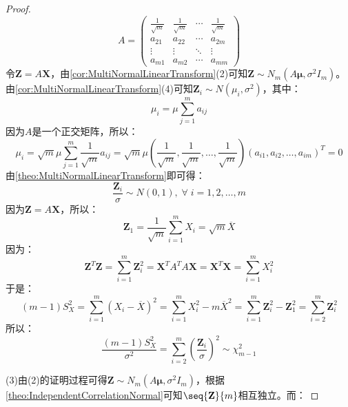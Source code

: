 \begin{proof}
\begin{equation*}
		A=
		\begin{pmatrix}
			\frac{1}{\sqrt{m}} & \frac{1}{\sqrt{m}} & \cdots & \frac{1}{\sqrt{m}} \\
			a_{21} & a_{22} & \cdots & a_{2m} \\
			\vdots & \vdots & \ddots & \vdots \\
			a_{m1} & a_{m2} & \cdots & a_{mm}
		\end{pmatrix}
	\end{equation*}
	令$\mathbf{Z}=A\mathbf{X}$，由\cref{cor:MultiNormalLinearTransform}(2)可知$\mathbf{Z}\sim N_m(A\boldsymbol{\mu},\sigma^2I_m)$。由\cref{cor:MultiNormalLinearTransform}(4)可知$\mathbf{Z}_i\sim N(\mu_i,\sigma^2)$，其中：
	\begin{equation*}
		\mu_i=\mu\sum_{j=1}^{m}a_{ij}
	\end{equation*}
	因为$A$是一个正交矩阵，所以：
	\begin{equation*}
		\mu_i=\sqrt{m}\mu\sum_{j=1}^{m}\frac{1}{\sqrt{m}}a_{ij}=\sqrt{m}\mu\left(\dfrac{1}{\sqrt{m}},\dfrac{1}{\sqrt{m}},\dots,\dfrac{1}{\sqrt{m}}\right)(a_{i1},a_{i2},\dots,a_{im})^T=0
	\end{equation*}
	由\cref{theo:MultiNormalLinearTransform}即可得：
	\begin{equation*}
		\frac{\mathbf{Z}_i}{\sigma}\sim N(0,1),\;\forall\;i=1,2,\dots,m
	\end{equation*}
	因为$\mathbf{Z}=A\mathbf{X}$，所以：
	\begin{equation*}
		\mathbf{Z}_1=\frac{1}{\sqrt{m}}\sum_{i=1}^{m}X_i=\sqrt{m}\overline{X}
	\end{equation*}
	因为：
	\begin{equation*}
		\mathbf{Z}^T\mathbf{Z}=\sum_{i=1}^{m}\mathbf{Z}_i^2=\mathbf{X}^TA^TA\mathbf{X}=\mathbf{X}^T\mathbf{X}=\sum_{i=1}^{m}X_i^2
	\end{equation*}
	于是：
	\begin{equation*}
		(m-1)S_X^2=\sum_{i=1}^{m}(X_i-\overline{X})^2=\sum_{i=1}^{m}X_i^2-m\overline{X}^2=\sum_{i=1}^{m}\mathbf{Z}_i^2-\mathbf{Z}_1^2=\sum_{i=2}^{m}\mathbf{Z}_i^2
	\end{equation*}
	所以：
	\begin{equation*}
		\frac{(m-1)S_X^2}{\sigma^2}=\sum_{i=2}^{m}\left(\frac{\mathbf{Z}_i}{\sigma}\right)^2\sim\chi_{m-1}^2
	\end{equation*}\par
	(3)由(2)的证明过程可得$\mathbf{Z}\sim N_m(A\boldsymbol{\mu},\sigma^2I_m)$，根据\cref{theo:IndependentCorrelationNormal}可知$\seq{\mathbf{Z}}{m}$相互独立。而：

\end{proof}
